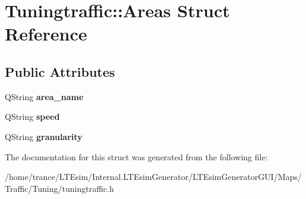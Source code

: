 \hypertarget{struct_tuningtraffic_1_1_areas}{}\section{Tuningtraffic\+:\+:Areas Struct Reference}
\label{struct_tuningtraffic_1_1_areas}
\subsection*{Public Attributes}
\begin{DoxyCompactItemize}
\item 
Q\+String {\bfseries area\+\_\+name}\hypertarget{struct_tuningtraffic_1_1_areas_a297675636696c347324da34d6bc2119b}{}\label{struct_tuningtraffic_1_1_areas_a297675636696c347324da34d6bc2119b}

\item 
Q\+String {\bfseries speed}\hypertarget{struct_tuningtraffic_1_1_areas_a64539cfbd72f104932194af33ead762a}{}\label{struct_tuningtraffic_1_1_areas_a64539cfbd72f104932194af33ead762a}

\item 
Q\+String {\bfseries granularity}\hypertarget{struct_tuningtraffic_1_1_areas_a42675f785a229a55b689a3638eb669fa}{}\label{struct_tuningtraffic_1_1_areas_a42675f785a229a55b689a3638eb669fa}

\end{DoxyCompactItemize}


The documentation for this struct was generated from the following file\+:\begin{DoxyCompactItemize}
\item 
/home/trance/\+L\+T\+Esim/\+Internal.\+L\+T\+Esim\+Generator/\+L\+T\+Esim\+Generator\+G\+U\+I/\+Maps/\+Traffic/\+Tuning/tuningtraffic.\+h\end{DoxyCompactItemize}
